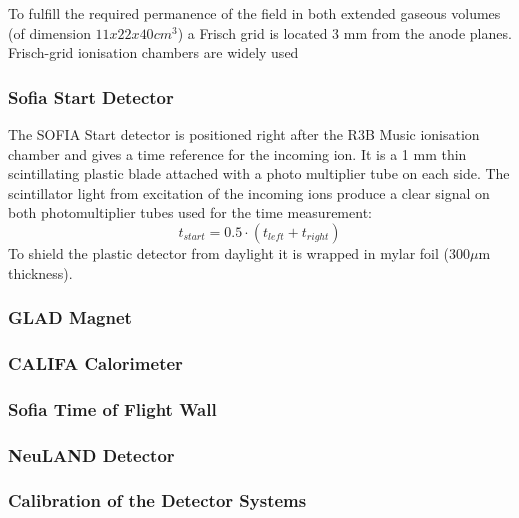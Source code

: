 To fulfill the required permanence of the field in both extended gaseous volumes (of dimension $11x22x40 cm^3$) a Frisch grid is located 3 mm from the anode planes. Frisch-grid ionisation chambers are widely used  
\newline
    

\subsubsection{Sofia Start Detector}
The SOFIA Start detector is positioned right after the R3B Music ionisation chamber and gives a time reference for the incoming ion. It is a 1 mm thin scintillating plastic blade attached with a photo multiplier tube on each side. The scintillator light from excitation of the incoming ions produce a clear signal on both photomultiplier tubes used for the time measurement: \[t_{start} = 0.5 \cdot (t_{left}+t_{right}) \]\newline
To shield the plastic detector from daylight it is wrapped in mylar foil (300$\mu$m thickness).
\subsubsection{GLAD Magnet}
\subsubsection{CALIFA Calorimeter}
\subsubsection{Sofia Time of Flight Wall}
\subsubsection{NeuLAND Detector}

\subsubsection{Calibration of the Detector Systems}



